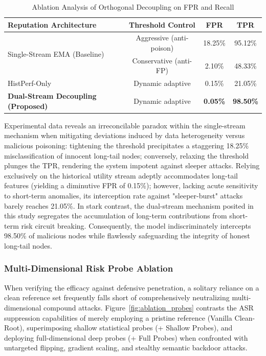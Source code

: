 \documentclass[11pt, a4paper]{article}
\begin{document}
\begin{table}[htbp]
    \centering
    \caption{Ablation Analysis of Orthogonal Decoupling on FPR and Recall}
    \label{tab:ablation_stream}
    \begin{tabular}{l c c c}
        \toprule
        \textbf{Reputation Architecture}              & \textbf{Threshold Control} & \textbf{FPR}    & \textbf{TPR}     \\
        \midrule
        \multirow{2}{*}{Single-Stream EMA (Baseline)} & Aggressive (anti-poison)   & 18.25\%         & 95.12\%          \\
                                                      & Conservative (anti-FP)     & 2.10\%          & 48.33\%          \\
        \midrule
        HistPerf-Only                                 & Dynamic adaptive           & 0.15\%          & 21.05\%          \\
        \textbf{Dual-Stream Decoupling (Proposed)}    & Dynamic adaptive           & \textbf{0.05\%} & \textbf{98.50\%} \\
        \bottomrule
    \end{tabular}
\end{table}

Experimental data reveals an irreconcilable paradox within the single-stream mechanism when mitigating deviations induced by data heterogeneity versus malicious poisoning: tightening the threshold precipitates a staggering 18.25\% misclassification of innocent long-tail nodes; conversely, relaxing the threshold plunges the TPR, rendering the system impotent against sleeper attacks. Relying exclusively on the historical utility stream adeptly accommodates long-tail features (yielding a diminutive FPR of 0.15\%); however, lacking acute sensitivity to short-term anomalies, its interception rate against "sleeper-burst" attacks barely reaches 21.05\%. In stark contrast, the dual-stream mechanism posited in this study segregates the accumulation of long-term contributions from short-term risk circuit breaking. Consequently, the model indiscriminately intercepts 98.50\% of malicious nodes while flawlessly safeguarding the integrity of honest long-tail nodes.

\subsubsection{Multi-Dimensional Risk Probe Ablation}
When verifying the efficacy against defensive penetration, a solitary reliance on a clean reference set frequently falls short of comprehensively neutralizing multi-dimensional compound attacks. Figure~\ref{fig:ablation_probes} contrasts the ASR suppression capabilities of merely employing a pristine reference (Vanilla Clean-Root), superimposing shallow statistical probes (+ Shallow Probes), and deploying full-dimensional deep probes (+ Full Probes) when confronted with untargeted flipping, gradient scaling, and stealthy semantic backdoor attacks.
\end{document}
